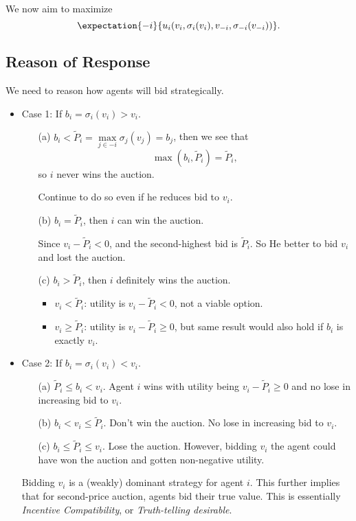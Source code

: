 We now aim to maximize
\[
	\expectation{-i}{u_{i}(v_{i}, \sigma_{i}(v_{i}), v_{-i}, \sigma_{-i}(v_{-i}))}.
\]

\subsection{Reason of Response}
We need to reason how agents will bid strategically.
\begin{itemize}
	\item Case 1: If \(b_{i} = \sigma_{i}(v_{i})>v_{i}\).
	      \begin{enumerate}
		      \item[(a)] \(b_{i}< \widetilde{P}_i = \max\limits_{j\in -i}\sigma_{j}(v_{j}) = b_{j}\), then we see that
			      \[
				      \max(b_{i}, \widetilde{P}_{i}) = \widetilde{P}_{i},
			      \]
			      so \(i\) never wins the auction.
			      \par Continue to do so even if he reduces bid to \(v_{i}\).
		      \item[(b)] \(b_{i} = \widetilde{P}_{i}\), then \(i\) can win the auction.
			      \par Since \(v_{i} - \widetilde{P}_{i}<0\),  and the second-highest bid is \(\widetilde{P}_{i}\). So He better to bid \(v_{i}\) and
			      lost the auction.
		      \item[(c)] \(b_{i} > \widetilde{P}_{i}\), then \(i\) definitely wins the auction.
			      \begin{itemize}
				      \item \(v_{i}<\widetilde{P}_{i}\): utility is \(v_{i} - \widetilde{P}_{i}<0\), not a viable option.
				      \item \(v_{i}\geq \widetilde{P}_{i}\): utility is \(v_{i} - \widetilde{P}_{i}\geq 0\), but
				            same result would also hold if \(b_{i}\) is exactly \(v_{i}\).
			      \end{itemize}
	      \end{enumerate}
	\item Case 2: If \(b_{i} = \sigma_{i}(v_{i})<v_{i}\).
	      \begin{enumerate}
		      \item[(a)] \(\widetilde{P}_{i}\leq b_{i}<v_{i}\). Agent \(i\) wins with utility being \(v_{i} - \widetilde{P}_{i}\geq 0\) and
			      no lose in increasing bid to \(v_{i}\).
		      \item[(b)] \(b_{i}< v_{i}\leq \widetilde{P}_{i}\). Don't win the auction. No lose in increasing bid to \(v_{i}\).
		      \item[(c)] \(b_{i}\leq \widetilde{P}_{i}\leq v_{i}\). Lose the auction. However, bidding \(v_{i}\) the agent could have won the
			      auction and gotten non-negative utility.
	      \end{enumerate}
	      \begin{remark}
		      Bidding \(v_i\) is a (weakly) dominant strategy for agent \(i\). This further implies that for second-price auction, agents
		      bid their true value. This is essentially \emph{Incentive Compatibility}, or \emph{Truth-telling desirable}.
	      \end{remark}
\end{itemize}

